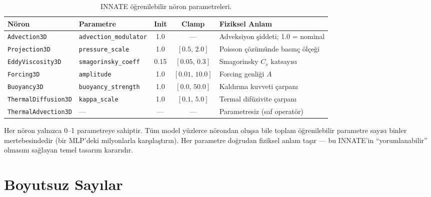 \begin{table}[H]
\centering
\caption{INNATE öğrenilebilir nöron parametreleri.}
\label{tab:noron_parametreleri}
\renewcommand{\arraystretch}{1.3}
\begin{tabular}{p{3.2cm}p{3.2cm}ccp{4.5cm}}
\toprule
\textbf{Nöron} & \textbf{Parametre} & \textbf{Init} & \textbf{Clamp} & \textbf{Fiziksel Anlam} \\
\midrule
\texttt{Advection3D}
    & \texttt{advection\_modulator}
    & 1.0
    & ---
    & Adveksiyon şiddeti; 1.0 = nominal \\
\texttt{Projection3D}
    & \texttt{pressure\_scale}
    & 1.0
    & $[0.5,\, 2.0]$
    & Poisson çözümünde basınç ölçeği \\
\texttt{EddyViscosity3D}
    & \texttt{smagorinsky\_coeff}
    & 0.15
    & $[0.05,\, 0.3]$
    & Smagorinsky $C_s$ katsayısı \\
\texttt{Forcing3D}
    & \texttt{amplitude}
    & 1.0
    & $[0.01,\, 10.0]$
    & Forcing genliği $A$ \\
\texttt{Buoyancy3D}
    & \texttt{buoyancy\_strength}
    & 1.0
    & $[0.0,\, 50.0]$
    & Kaldırma kuvveti çarpanı \\
\texttt{ThermalDiffusion3D}
    & \texttt{kappa\_scale}
    & 1.0
    & $[0.1,\, 5.0]$
    & Termal difüzivite çarpanı \\
\texttt{ThermalAdvection3D}
    & ---
    & ---
    & ---
    & Parametresiz (saf operatör) \\
\bottomrule
\end{tabular}
\end{table}

\begin{remark}
Her nöron yalnızca 0--1 parametreye sahiptir. Tüm model yüzlerce nörondan oluşsa bile toplam öğrenilebilir parametre sayısı binler mertebesindedir (bir MLP'deki milyonlarla karşılaştırın). Her parametre doğrudan fiziksel anlam taşır --- bu INNATE'in ``yorumlanabilir'' olmasını sağlayan temel tasarım kararıdır.
\end{remark}


\section{Boyutsuz Sayılar}
\label{sec:boyutsuz_sayilar}

